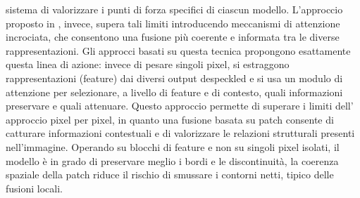 sistema di valorizzare i punti di forza specifici di ciascun modello. L’approccio proposto in \cite{li2024crossfuse}, invece, 
supera tali limiti introducendo meccanismi di attenzione incrociata, che consentono una fusione più 
coerente e informata tra le diverse rappresentazioni.
Gli approcci basati su questa tecnica propongono esattamente questa linea di azione: 
invece di pesare singoli pixel, si estraggono rappresentazioni (feature) dai diversi output despeckled e si usa un modulo 
di attenzione per selezionare, a livello di feature e di contesto, quali informazioni preservare e quali attenuare. 
Questo approccio permette di superare i limiti dell' approccio pixel per pixel, in quanto una fusione basata su patch consente 
di catturare informazioni contestuali e di valorizzare le relazioni strutturali presenti nell’immagine. Operando 
su blocchi di feature e non su singoli pixel isolati, il modello è in grado di preservare meglio i bordi e le 
discontinuità, la coerenza spaziale della patch riduce il rischio di smussare i contorni netti, tipico delle 
fusioni locali.